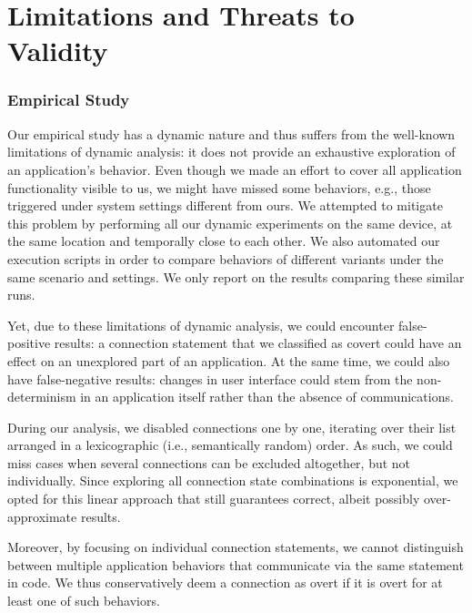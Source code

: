 \vspace{0.05in}
\vspace{-0.1in}
\section{Limitations and Threats to \\Validity}
\label{sec:limitations}

\subsubsection{Empirical Study}
Our empirical study has a dynamic nature and thus suffers from the well-known limitations of dynamic analysis: it does not provide an exhaustive exploration of an application's behavior.
Even though we made an effort to cover all application functionality visible to us, we might have missed some behaviors, e.g., those triggered under system settings different from ours. 
We attempted to mitigate this problem by performing all our dynamic experiments on the same device, at the same location and temporally close to each other.  
We also automated our execution scripts in order to compare behaviors of different variants under the same scenario and settings. 
We only report on the results comparing these similar runs.  

Yet, due to these limitations of dynamic analysis, we could encounter false-positive results: a connection statement that we classified as covert could have an effect on an unexplored part of an application. 
At the same time, we could also have false-negative results: changes in user interface could stem from the non-determinism in an application itself rather than the absence of communications. 

During our analysis, we disabled connections one by one, iterating over their list arranged in a lexicographic (i.e., semantically random) order. As such, we could miss cases when 
several connections can be excluded altogether, but not individually. 
Since exploring all connection state combinations is exponential, we opted for this linear approach that still guarantees correct, 
albeit possibly over-approximate results. 

Moreover, by focusing on individual connection statements, we cannot distinguish between multiple application behaviors
that communicate via the same statement in code. We thus conservatively deem a connection as overt if it is overt for at least one of such behaviors. 
 

